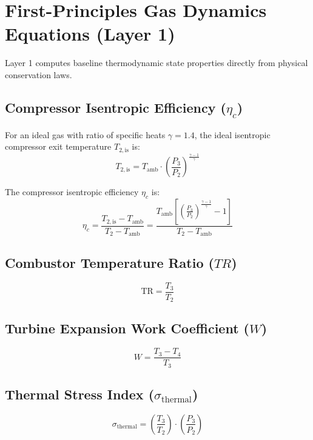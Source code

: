 \documentclass[11pt,a4paper]{article}
\begin{document}
\section{First-Principles Gas Dynamics Equations (Layer 1)}
Layer 1 computes baseline thermodynamic state properties directly from physical conservation laws.

\subsection{Compressor Isentropic Efficiency ($\eta_c$)}
For an ideal gas with ratio of specific heats $\gamma = 1.4$, the ideal isentropic compressor exit temperature $T_{2,\text{is}}$ is:
\begin{equation}
T_{2,\text{is}} = T_{\text{amb}} \cdot \left( \frac{P_3}{P_2} \right)^{\frac{\gamma - 1}{\gamma}}
\end{equation}

The compressor isentropic efficiency $\eta_c$ is:
\begin{equation}
\eta_c = \frac{T_{2,\text{is}} - T_{\text{amb}}}{T_2 - T_{\text{amb}}} = \frac{T_{\text{amb}} \left[ \left(\frac{P_3}{P_2}\right)^{\frac{\gamma-1}{\gamma}} - 1 \right]}{T_2 - T_{\text{amb}}}
\end{equation}

\subsection{Combustor Temperature Ratio ($TR$)}
\begin{equation}
\text{TR} = \frac{T_3}{T_2}
\end{equation}

\subsection{Turbine Expansion Work Coefficient ($W$)}
\begin{equation}
W = \frac{T_3 - T_4}{T_3}
\end{equation}

\subsection{Thermal Stress Index ($\sigma_{\text{thermal}}$)}
\begin{equation}
\sigma_{\text{thermal}} = \left( \frac{T_3}{T_2} \right) \cdot \left( \frac{P_3}{P_2} \right)
\end{equation}
\end{document}
